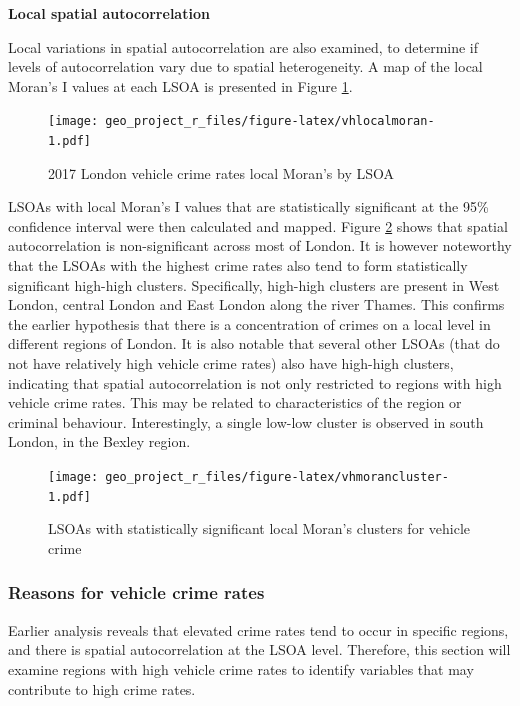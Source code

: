 \documentclass[]{article}
\begin{document}
\textbf{Local spatial autocorrelation}

Local variations in spatial autocorrelation are also examined, to
determine if levels of autocorrelation vary due to spatial
heterogeneity. A map of the local Moran's I values at each LSOA is
presented in Figure \ref{fig:vhlocalmoran}.

\begin{figure}
\centering
\texttt{[image: geo\_project\_r\_files/figure-latex/vhlocalmoran-1.pdf]}
\caption{\label{fig:vhlocalmoran}2017 London vehicle crime rates local
Moran's by LSOA}
\end{figure}

LSOAs with local Moran's I values that are statistically significant at
the 95\% confidence interval were then calculated and mapped. Figure
\ref{fig:vhmorancluster} shows that spatial autocorrelation is
non-significant across most of London. It is however noteworthy that the
LSOAs with the highest crime rates also tend to form statistically
significant high-high clusters. Specifically, high-high clusters are
present in West London, central London and East London along the river
Thames. This confirms the earlier hypothesis that there is a
concentration of crimes on a local level in different regions of London.
It is also notable that several other LSOAs (that do not have relatively
high vehicle crime rates) also have high-high clusters, indicating that
spatial autocorrelation is not only restricted to regions with high
vehicle crime rates. This may be related to characteristics of the
region or criminal behaviour. Interestingly, a single low-low cluster is
observed in south London, in the Bexley region.

\begin{figure}
\centering
\texttt{[image: geo\_project\_r\_files/figure-latex/vhmorancluster-1.pdf]}
\caption{\label{fig:vhmorancluster}LSOAs with statistically significant
local Moran's clusters for vehicle crime}
\end{figure}

\subsubsection{Reasons for vehicle crime
rates}\label{reasons-for-vehicle-crime-rates}

Earlier analysis reveals that elevated crime rates tend to occur in
specific regions, and there is spatial autocorrelation at the LSOA
level. Therefore, this section will examine regions with high vehicle
crime rates to identify variables that may contribute to high crime
rates.
\end{document}
